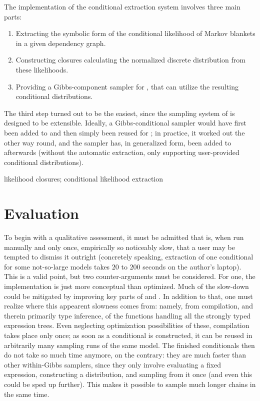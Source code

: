 The implementation of the conditional extraction system involves three main parts:
\begin{enumerate}
  \firmlist
\item Extracting the symbolic form of the conditional likelihood of Markov blankets in a given
  dependency graph.
\item Constructing closures calculating the normalized discrete distribution from these likelihoods.
\item Providing a Gibbs-component sampler for \turingjl{}, that can utilize the resulting
  conditional distributions.
\end{enumerate}
The third step turned out to be the easiest, since the sampling system of \turingjl{} is designed to
be extensible.  Ideally, a Gibbs-conditional sampler would have first been added to \turingjl{} and
then simply been reused for \autogibbsjl{}; in practice, it worked out the other way round, and the
\autogibbsjl{} sampler has, in generalized form, been added to \turingjl{} afterwards (without the
automatic extraction, only supporting user-provided conditional distributions).

likelihood closures; conditional likelihood extraction

\section{Evaluation}
\label{sec:autogibbs-eval}

To begin with a qualitative assessment, it must be admitted that \autogibbsjl{} is, when run
manually and only once, empirically so noticeably slow, that a user may be tempted to dismiss it
outright (concretely speaking, extraction of one conditional for some not-so-large models takes
\(20\) to \(200\) seconds on the author's laptop).  This is a valid point, but two counter-arguments
must be considered.  For one, the implementation is just more conceptual than optimized.  Much of
the slow-down could be mitigated by improving key parts of \autogibbsjl{} and \irtrackerjl{}.  In
addition to that, one must realize where this appearent slowness comes from: namely, from
compilation, and therein primarily type inference, of the functions handling all the strongly typed
expression trees.  Even neglecting optimization possibilities of these, compilation takes place only
once; as soon as a conditional is constructed, it can be reused in arbitrarily many sampling runs of
the same model.  The finished conditionals then do not take so much time anymore, on the contrary:
they are much faster than other within-Gibbs samplers, since they only involve evaluating a fixed
expression, constructing a distribution, and sampling from it once (and even this could be sped up
further).  This makes it possible to sample much longer chains in the same time.

